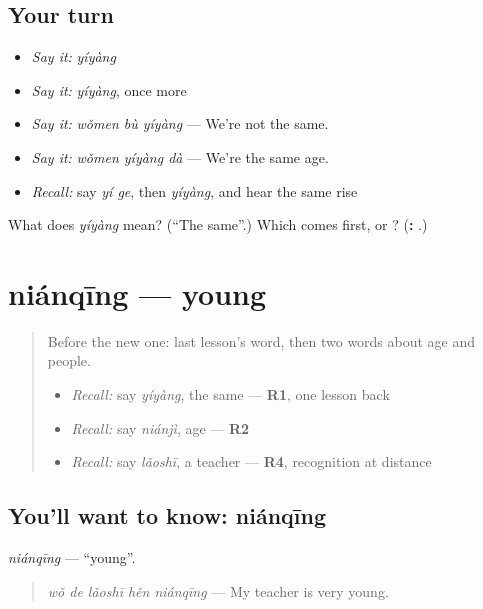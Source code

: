 \subsection*{Your turn}
\begin{itemize}
\raggedright
  \item \emph{Say it:} \emph{yíyàng}
  \item \emph{Say it:} \emph{yíyàng}, once more
  \item \emph{Say it:} \emph{wǒmen bù yíyàng} — We're not the same.
  \item \emph{Say it:} \emph{wǒmen yíyàng dà} — We're the same age.
  \item \emph{Recall:} say \emph{yí ge}, then \emph{yíyàng}, and hear the same rise
\end{itemize}

\begin{tcolorbox}[breakable,colback=teal!4,colframe=teal!35!black,title={Before you move on}]
What does \emph{yíyàng} mean? (\textquotedblleft{}The same\textquotedblright{}.) Which comes first,  or ? (\textbf{: }.)
\end{tcolorbox}
\section[niánqīng]{niánqīng — young}

\label{lesson:ZH-C94-nianqing}



\begin{quote}
Before the new one: last lesson's word, then two words about age and people.

\begin{itemize}
\raggedright
  \item \emph{Recall:} say \emph{yíyàng}, the same — \textbf{R1}, one lesson back
  \item \emph{Recall:} say \emph{niánjì}, age — \textbf{R2}
  \item \emph{Recall:} say \emph{lǎoshī}, a teacher — \textbf{R4}, recognition at distance
\end{itemize}
\end{quote}

\subsection*{You'll want to know: niánqīng}
\emph{niánqīng} — \textquotedblleft{}young\textquotedblright{}.

\begin{quote}
\emph{wǒ de lǎoshī hěn niánqīng} — My teacher is very young.
\end{quote}

